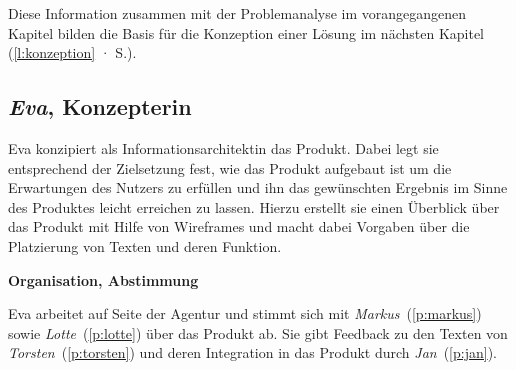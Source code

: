\secbar

Diese Information zusammen mit der Problemanalyse im vorangegangenen Kapitel bilden die Basis für die Konzeption einer Lösung im nächsten Kapitel (\ref{l:konzeption} · S.\pageref{l:konzeption}).

\pagebreak

\subsection{\emph{Eva}, Konzepterin}\label{p:eva}

\begin{multicols}{2}

\begin{center}
\end{center}


Eva konzipiert als Informationsarchitektin das Produkt. Dabei legt sie entsprechend der Zielsetzung fest, wie das Produkt aufgebaut ist um die Erwartungen des Nutzers zu erfüllen und ihn das gewünschten Ergebnis im Sinne des Produktes leicht erreichen zu lassen. Hierzu erstellt sie einen Überblick über das Produkt mit Hilfe von Wireframes und macht dabei Vorgaben über die Platzierung von Texten und deren Funktion.

\textbf{Organisation, Abstimmung}

Eva arbeitet auf Seite der Agentur und stimmt sich mit \emph{Markus}~(\ref{p:markus}) sowie \emph{Lotte}~(\ref{p:lotte}) über das Produkt ab. Sie gibt Feedback zu den Texten von \emph{Torsten}~(\ref{p:torsten}) und deren Integration in das Produkt durch \emph{Jan}~(\ref{p:jan}).


\end{multicols}
